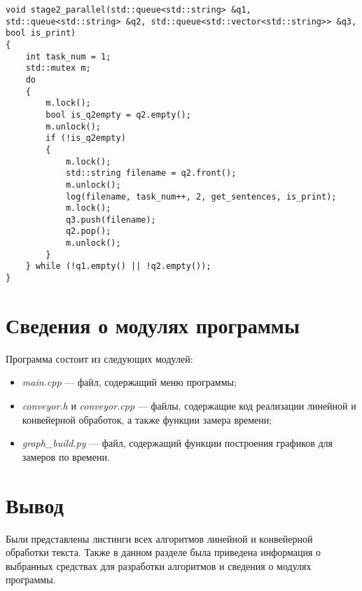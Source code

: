 \clearpage

\begin{center}
    \captionsetup{justification=raggedright,singlelinecheck=off}
    \begin{lstlisting}[label=lst:2,caption=Алгоритм запуска 2 потока для разделения текста на предложения]
void stage2_parallel(std::queue<std::string> &q1, std::queue<std::string> &q2, std::queue<std::vector<std::string>> &q3, bool is_print)
{
	int task_num = 1;
	std::mutex m;
	do
	{   
		m.lock();
		bool is_q2empty = q2.empty();
		m.unlock();
		if (!is_q2empty)
		{   
			m.lock();
			std::string filename = q2.front();
			m.unlock();
			log(filename, task_num++, 2, get_sentences, is_print);
			m.lock();
			q3.push(filename);
			q2.pop();
			m.unlock();
		}
	} while (!q1.empty() || !q2.empty());
}
\end{lstlisting}
\end{center}

\section{Сведения о модулях программы}
Программа состоит из следующих модулей:
\begin{itemize}
	\item \textit{main.cpp} --- файл, содержащий меню программы;
	\item \textit{conveyor.h} и \textit{conveyor.cpp} --- файлы, содержащие код реализации линейной и конвейерной обработок, а также функции замера времени;
	\item \textit{graph\_build.py} --- файл, содержащий функции построения графиков для замеров по времени.
\end{itemize}


\section{Вывод}

Были представлены листинги всех алгоритмов линейной и конвейерной обработки текста. Также в данном разделе была приведена информация о выбранных средствах для разработки алгоритмов и сведения о модулях программы.
